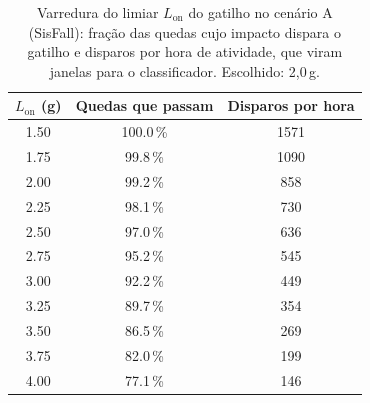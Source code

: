 \begin{table}[H]
\centering
\caption{Varredura do limiar $L_\text{on}$ do gatilho no cenário A (SisFall): fração das quedas cujo impacto dispara o gatilho e disparos por hora de atividade, que viram janelas para o classificador. Escolhido: 2,0\,g.}
\label{tab:gatilho}
\small
\setlength{\tabcolsep}{4pt}
\begin{tabular}{ccc}
\toprule
$L_\text{on}$ (g) & Quedas que passam & Disparos por hora \\
\midrule
\num{1.50} & \num{100.0}\,\% & \num{1571} \\
\num{1.75} & \num{99.8}\,\% & \num{1090} \\
\num{2.00} & \num{99.2}\,\% & \num{858} \\
\num{2.25} & \num{98.1}\,\% & \num{730} \\
\num{2.50} & \num{97.0}\,\% & \num{636} \\
\num{2.75} & \num{95.2}\,\% & \num{545} \\
\num{3.00} & \num{92.2}\,\% & \num{449} \\
\num{3.25} & \num{89.7}\,\% & \num{354} \\
\num{3.50} & \num{86.5}\,\% & \num{269} \\
\num{3.75} & \num{82.0}\,\% & \num{199} \\
\num{4.00} & \num{77.1}\,\% & \num{146} \\
\bottomrule
\end{tabular}
\end{table}
